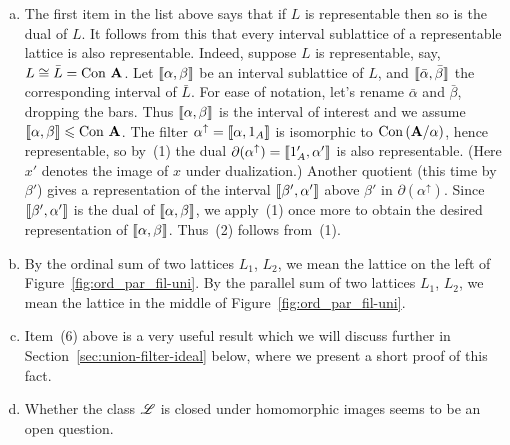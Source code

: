 \begin{remarks}
  \begin{enumerate}[a.]
  \item 
  The first item in the list above says that if $L$ is representable then so is
  the dual of $L$. It follows from this that every interval sublattice of a
  representable lattice is also representable.  
  Indeed, suppose $L$ is representable, say, $L\cong \bar{L} =\operatorname{Con\,}\mathbf{A}$.
  Let $\llbracket \alpha, \beta \rrbracket$ be an interval sublattice of $L$,
  and $\llbracket \bar{\alpha}, \bar{\beta} \rrbracket$ the corresponding  
  interval of $\bar{L}$.
  For ease of notation, let's rename $\bar{\alpha}$ and $\bar{\beta}$, dropping
  the bars.  Thus $\llbracket \alpha, \beta \rrbracket$ is the interval of interest and we
  assume $\llbracket \alpha, \beta \rrbracket\leqslant \operatorname{Con\,} \mathbf{A}$.
  The filter $\alpha^\uparrow =\llbracket \alpha, 1_A \rrbracket$ 
  is isomorphic to $\operatorname{Con\,} (\mathbf{A}/\alpha)$, hence representable, so
  by~(1) the dual $\partial (\alpha^\uparrow)=\llbracket 1_A', \alpha'\rrbracket$ is also
  representable. (Here $x'$ denotes the image of $x$ under dualization.)
  Another quotient (this time by $\beta'$) gives a representation of
  the interval $\llbracket \beta', \alpha'\rrbracket$ above $\beta'$ in 
  $\partial (\alpha^\uparrow)$. 
  Since $\llbracket \beta', \alpha' \rrbracket$  is the dual of $\llbracket \alpha, \beta \rrbracket$, 
  we apply~(1) once more to obtain the desired representation of 
  $\llbracket \alpha, \beta\rrbracket$.  Thus~(2) follows from~(1).

  \item By the ordinal sum of two lattices $L_1$, $L_2$, we mean the lattice
  on the left of Figure~\ref{fig:ord_par_fil-uni}.
  By the parallel sum of two lattices $L_1$, $L_2$, we mean the lattice
  in the middle of Figure~\ref{fig:ord_par_fil-uni}.

\item Item~(6) above is a very useful result which we will discuss further in
  Section~\ref{sec:union-filter-ideal} below, where we present a short proof of
  this fact.

\item Whether the class $\mathscr{L}$ is closed under homomorphic images
  seems to be an open question. 
  \end{enumerate}
\end{remarks}


